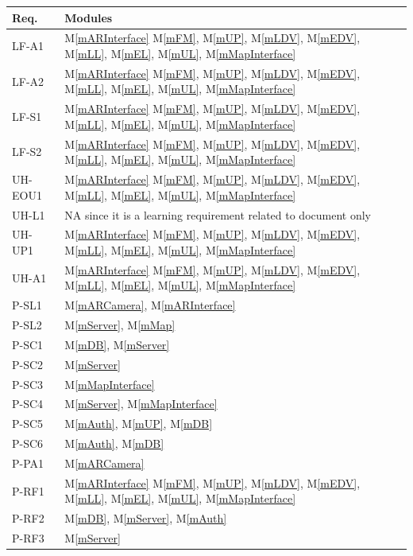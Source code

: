 \documentclass[12pt, titlepage]{article}
\newcommand{\mref}[1]{M\ref{#1}}
\begin{document}
\begin{table}[H]
\centering
\begin{tabular}{p{} p{}}
\toprule
\textbf{Req.} & \textbf{Modules}\\
\midrule
LF-A1 & \mref{mARInterface} \mref{mFM}, \mref{mUP}, \mref{mLDV}, \mref{mEDV}, \mref{mLL}, \mref{mEL}, \mref{mUL}, \mref{mMapInterface}\\
LF-A2 & \mref{mARInterface} \mref{mFM}, \mref{mUP}, \mref{mLDV}, \mref{mEDV}, \mref{mLL}, \mref{mEL}, \mref{mUL}, \mref{mMapInterface}\\
LF-S1 & \mref{mARInterface} \mref{mFM}, \mref{mUP}, \mref{mLDV}, \mref{mEDV}, \mref{mLL}, \mref{mEL}, \mref{mUL}, \mref{mMapInterface}\\
LF-S2 & \mref{mARInterface} \mref{mFM}, \mref{mUP}, \mref{mLDV}, \mref{mEDV}, \mref{mLL}, \mref{mEL}, \mref{mUL}, \mref{mMapInterface}\\
UH-EOU1 & \mref{mARInterface} \mref{mFM}, \mref{mUP}, \mref{mLDV}, \mref{mEDV}, \mref{mLL}, \mref{mEL}, \mref{mUL}, \mref{mMapInterface}\\
UH-L1 & NA since it is a learning requirement related to document only\\
UH-UP1 & \mref{mARInterface} \mref{mFM}, \mref{mUP}, \mref{mLDV}, \mref{mEDV}, \mref{mLL}, \mref{mEL}, \mref{mUL}, \mref{mMapInterface}\\
UH-A1 & \mref{mARInterface} \mref{mFM}, \mref{mUP}, \mref{mLDV}, \mref{mEDV}, \mref{mLL}, \mref{mEL}, \mref{mUL}, \mref{mMapInterface}\\
P-SL1 & \mref{mARCamera}, \mref{mARInterface}\\
P-SL2 & \mref{mServer}, \mref{mMap}\\
P-SC1 & \mref{mDB}, \mref{mServer}\\
P-SC2 & \mref{mServer}\\
P-SC3 & \mref{mMapInterface}\\
P-SC4 & \mref{mServer}, \mref{mMapInterface}\\
P-SC5 & \mref{mAuth}, \mref{mUP}, \mref{mDB}\\
P-SC6 & \mref{mAuth}, \mref{mDB}\\
P-PA1 & \mref{mARCamera}\\
P-RF1 & \mref{mARInterface} \mref{mFM}, \mref{mUP}, \mref{mLDV}, \mref{mEDV}, \mref{mLL}, \mref{mEL}, \mref{mUL}, \mref{mMapInterface}\\
P-RF2 & \mref{mDB}, \mref{mServer}, \mref{mAuth}\\
P-RF3 & \mref{mServer}\\

\end{tabular}
\end{table}
\end{document}
